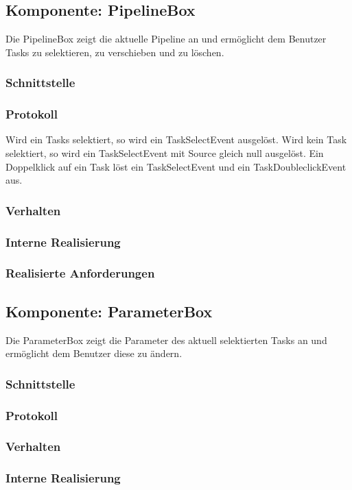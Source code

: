 \documentclass[a4paper,12pt]{scrartcl}
\begin{document}
\subsection{Komponente: PipelineBox}
Die PipelineBox zeigt die aktuelle Pipeline an und ermöglicht dem Benutzer Tasks zu selektieren, zu verschieben und zu löschen. 
\subsubsection{Schnittstelle}

\subsubsection{Protokoll}
Wird ein Tasks selektiert, so wird ein TaskSelectEvent ausgelöst. Wird kein Task selektiert, so wird ein TaskSelectEvent mit Source gleich null ausgelöst. Ein Doppelklick auf ein Task löst ein TaskSelectEvent und ein TaskDoubleclickEvent aus.
\subsubsection{Verhalten}

\subsubsection{Interne Realisierung}
\subsubsection{Realisierte Anforderungen}

\subsection{Komponente: ParameterBox}
Die ParameterBox zeigt die Parameter des aktuell selektierten Tasks an und ermöglicht dem Benutzer diese zu ändern. 
\subsubsection{Schnittstelle}
\subsubsection{Protokoll}
\subsubsection{Verhalten}
\subsubsection{Interne Realisierung}
\end{document}
